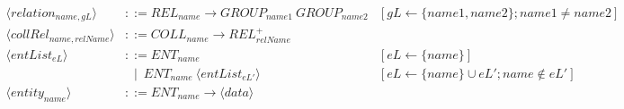 \begin{landscape}
\begin{adjustbox}{max width=\linewidth,max height=.95\textheight,valign=c}
{\begin{align}
                \langle relation_{name, gL} \rangle          & ::= REL_{name} \to GROUP_{name1} ~ GROUP_{name2}                                                             & [gL \gets \{name1, name2\}; name1 \neq name2]                                                          \\
                \langle collRel_{name,relName} \rangle       & ::= COLL_{name} \to REL_{relName}^+                                                                                                                                                                                   \\[1em]
                \langle entList_{eL} \rangle                 & ::= ENT_{name}                                                                                               & [eL \gets \{name\}]                                                                                    \\
                                                             & ~~ \mid ~ ENT_{name} ~ \langle entList_{eL'} \rangle                                                         & [eL \gets \{name\} \cup eL'; name \notin eL']                                                          \\
                \langle entity_{name} \rangle                & ::= ENT_{name} \to \langle data \rangle
            \end{align}}
    \end{adjustbox}
\end{landscape}

